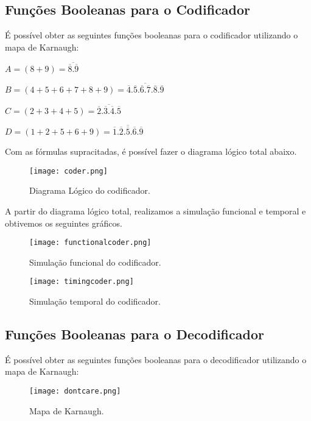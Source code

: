 \documentclass[12pt]{article}
\begin{document}
\subsection{Funções Booleanas para o Codificador}
\label{sec:Cod}

É possível obter as seguintes funções booleanas para o codificador utilizando o mapa de Karnaugh:

$A = (8+9) = \overline{\overline{8}.\overline{9}}$

$B = (4 + 5 + 6 + 7 + 8 + 9) = \overline{\overline{4}.\overline{5}.\overline{6}.\overline{7}.\overline{8}.\overline{9}} $

$C = (2 + 3 + 4 + 5) = \overline{\overline{2}.\overline{3}.\overline{4}.\overline{5}}$

$D = (1 + 2 + 5 + 6 + 9) = \overline{\overline{1}.\overline{2}.\overline{5}.\overline{6}.\overline{9}}$

Com as fórmulas supracitadas, é possível fazer o diagrama lógico total abaixo.

\begin{figure}[H]
	\centering
	\texttt{[image: coder.png]}
	\caption{Diagrama Lógico do codificador.}
	\label{fig:coder}
\end{figure}

A partir do diagrama lógico total, realizamos a simulação funcional e temporal e obtivemos os seguintes gráficos.

\begin{figure}[H]
	\centering
	\texttt{[image: functionalcoder.png]}
	\caption{Simulação funcional do codificador.}
	\label{fig:funccoder}
\end{figure}

\begin{figure}[H]
	\centering
	\texttt{[image: timingcoder.png]}
	\caption{Simulação temporal do codificador.}
	\label{fig:timecoder}
\end{figure}


\subsection{Funções Booleanas para o Decodificador}
\label{sec:Decod}


É possível obter as seguintes funções booleanas para o decodificador utilizando o mapa de Karnaugh:

\begin{figure}[H]
	\centering
	\texttt{[image: dontcare.png]}
	\caption{Mapa de Karnaugh.}
	\label{fig:dontcare}
\end{figure}
\newpage
\end{document}
